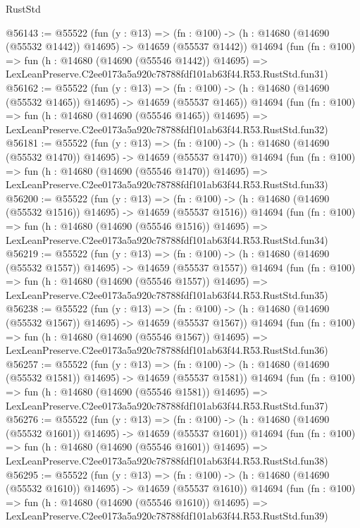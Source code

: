 \begin{lexlean}{RustStd}
\begin{coremodule}
@56143 := @55522
    (fun (y : @13) =>
    (fn : @100) -> (h : @14680 (@14690 (@55532 @1442)) @14695) -> @14659 (@55537 @1442))
    @14694
    (fun (fn : @100) =>
    fun (h : @14680 (@14690 (@55546 @1442)) @14695) =>
    LexLeanPreserve.C2ee0173a5a920c78788fdf101ab63f44.R53.RustStd.fun31)
@56162 := @55522
    (fun (y : @13) =>
    (fn : @100) -> (h : @14680 (@14690 (@55532 @1465)) @14695) -> @14659 (@55537 @1465))
    @14694
    (fun (fn : @100) =>
    fun (h : @14680 (@14690 (@55546 @1465)) @14695) =>
    LexLeanPreserve.C2ee0173a5a920c78788fdf101ab63f44.R53.RustStd.fun32)
@56181 := @55522
    (fun (y : @13) =>
    (fn : @100) -> (h : @14680 (@14690 (@55532 @1470)) @14695) -> @14659 (@55537 @1470))
    @14694
    (fun (fn : @100) =>
    fun (h : @14680 (@14690 (@55546 @1470)) @14695) =>
    LexLeanPreserve.C2ee0173a5a920c78788fdf101ab63f44.R53.RustStd.fun33)
@56200 := @55522
    (fun (y : @13) =>
    (fn : @100) -> (h : @14680 (@14690 (@55532 @1516)) @14695) -> @14659 (@55537 @1516))
    @14694
    (fun (fn : @100) =>
    fun (h : @14680 (@14690 (@55546 @1516)) @14695) =>
    LexLeanPreserve.C2ee0173a5a920c78788fdf101ab63f44.R53.RustStd.fun34)
@56219 := @55522
    (fun (y : @13) =>
    (fn : @100) -> (h : @14680 (@14690 (@55532 @1557)) @14695) -> @14659 (@55537 @1557))
    @14694
    (fun (fn : @100) =>
    fun (h : @14680 (@14690 (@55546 @1557)) @14695) =>
    LexLeanPreserve.C2ee0173a5a920c78788fdf101ab63f44.R53.RustStd.fun35)
@56238 := @55522
    (fun (y : @13) =>
    (fn : @100) -> (h : @14680 (@14690 (@55532 @1567)) @14695) -> @14659 (@55537 @1567))
    @14694
    (fun (fn : @100) =>
    fun (h : @14680 (@14690 (@55546 @1567)) @14695) =>
    LexLeanPreserve.C2ee0173a5a920c78788fdf101ab63f44.R53.RustStd.fun36)
@56257 := @55522
    (fun (y : @13) =>
    (fn : @100) -> (h : @14680 (@14690 (@55532 @1581)) @14695) -> @14659 (@55537 @1581))
    @14694
    (fun (fn : @100) =>
    fun (h : @14680 (@14690 (@55546 @1581)) @14695) =>
    LexLeanPreserve.C2ee0173a5a920c78788fdf101ab63f44.R53.RustStd.fun37)
@56276 := @55522
    (fun (y : @13) =>
    (fn : @100) -> (h : @14680 (@14690 (@55532 @1601)) @14695) -> @14659 (@55537 @1601))
    @14694
    (fun (fn : @100) =>
    fun (h : @14680 (@14690 (@55546 @1601)) @14695) =>
    LexLeanPreserve.C2ee0173a5a920c78788fdf101ab63f44.R53.RustStd.fun38)
@56295 := @55522
    (fun (y : @13) =>
    (fn : @100) -> (h : @14680 (@14690 (@55532 @1610)) @14695) -> @14659 (@55537 @1610))
    @14694
    (fun (fn : @100) =>
    fun (h : @14680 (@14690 (@55546 @1610)) @14695) =>
    LexLeanPreserve.C2ee0173a5a920c78788fdf101ab63f44.R53.RustStd.fun39)

\end{coremodule}
\end{lexlean}
